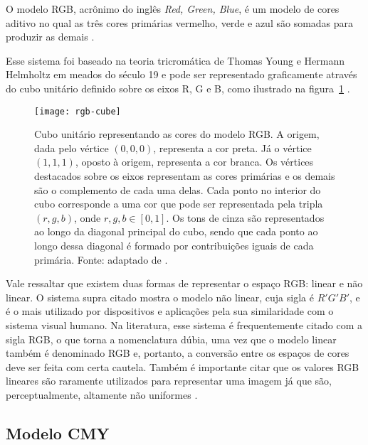 O modelo RGB, acrônimo do inglês \textit{Red, Green, Blue}, é um modelo de cores aditivo no qual as três cores primárias vermelho, verde e azul são somadas para produzir as demais \citep{gonzalez:02}.

Esse sistema foi baseado na teoria tricromática de Thomas Young e Hermann Helmholtz em meados do século 19 e pode ser representado graficamente
através do cubo unitário definido sobre os eixos R, G e B, como ilustrado na figura~\ref{fig:rgb-cube} \citep{konstantinos:00}.

\begin{figure}[!h]
  \centering
  \texttt{[image: rgb-cube]}
  \caption[Cubo unitário representando as cores do modelo RGB]{Cubo unitário representando as cores do modelo RGB. A origem, dada pelo vértice $(0, 0, 0)$, representa a cor preta. Já o vértice $(1, 1, 1)$, oposto à origem, representa a cor branca. Os vértices destacados sobre os eixos representam as cores primárias e os demais são o complemento de cada uma delas. Cada ponto no interior do cubo corresponde a uma cor que pode ser representada pela tripla $(r, g, b)$, onde $r, g, b \in [0, 1]$. Os tons de cinza são representados ao longo da diagonal principal do cubo, sendo que cada ponto ao longo dessa diagonal é formado por contribuições iguais de cada primária. Fonte: adaptado de \citet{gonzalez:02}.}
  \label{fig:rgb-cube} 
\end{figure}

Vale ressaltar que existem duas formas de representar o espaço RGB: linear e não linear. O sistema supra citado mostra o modelo não linear, cuja sigla é $R'G'B'$, e é o mais utilizado por dispositivos e aplicações pela sua similaridade com o sistema visual humano. Na literatura, esse sistema é frequentemente citado com a sigla RGB, o que torna a nomenclatura dúbia, uma vez que o modelo linear também é denominado RGB e, portanto, a conversão entre os espaços de cores deve ser feita com certa cautela. Também é importante citar que os valores RGB lineares são raramente utilizados para representar uma imagem já que são, perceptualmente, altamente não uniformes \citep{konstantinos:00}.


\subsection{Modelo CMY}
\label{sec:modelo_cores_cmy}

